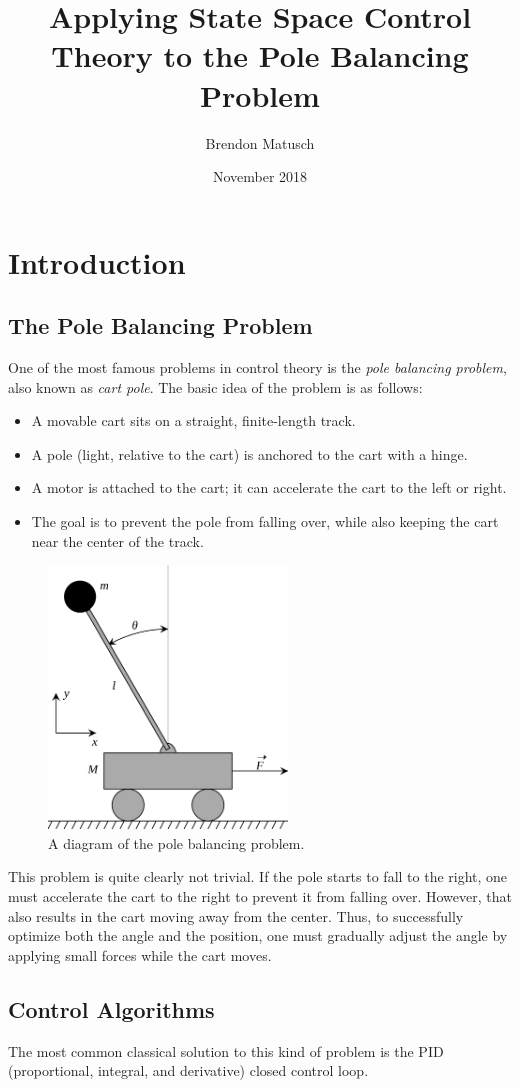 \documentclass[12pt]{article}
\begin{document}
\title{Applying State Space Control Theory to the Pole Balancing Problem}
\author{Brendon Matusch}
\date{November 2018}
\maketitle

\section{Introduction}

\subsection{The Pole Balancing Problem}

One of the most famous problems in control theory is the \textit{pole balancing problem}, also known as \textit{cart pole}. The basic idea of the problem is as follows:
\begin{itemize}
    \item A movable cart sits on a straight, finite-length track.
    \item A pole (light, relative to the cart) is anchored to the cart with a hinge.
    \item A motor is attached to the cart; it can accelerate the cart to the left or right.
    \item The goal is to prevent the pole from falling over, while also keeping the cart near the center of the track.
\end{itemize}

\begin{figure}[h]
    \centering
    \includegraphics[width=180pt]{cartpole}
    \caption{\label{cartpole} A diagram of the pole balancing problem.}
\end{figure}

This problem is quite clearly not trivial. If the pole starts to fall to the right, one must accelerate the cart to the right to prevent it from falling over. However, that also results in the cart moving away from the center. Thus, to successfully optimize both the angle and the position, one must gradually adjust the angle by applying small forces while the cart moves.

\subsection{Control Algorithms}

The most common classical solution to this kind of problem is the PID (proportional, integral, and derivative) closed control loop.
\end{document}
